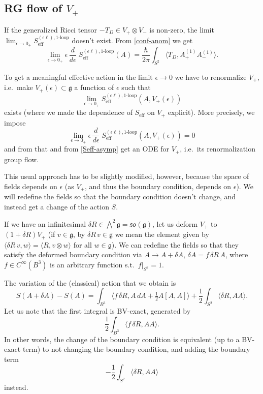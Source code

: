 \documentclass[a4paper]{amsart}
\theoremstyle{plain}
\theoremstyle{definition}
\newcommand{\mf}{\mathfrak}
\newcommand{\g}{\mathfrak{g}}
\newcommand{\bw}{{\textstyle\bigwedge}}
\newcommand{\la}{\langle}
\newcommand{\ra}{\rangle}
\begin{document}
\subsection{RG flow of $V_+$}\label{ss:RGflow}
If the generalized Ricci tensor $-T_{D}\in V_+\otimes V_-$ is non-zero, the limit $\lim_{\epsilon\to0_+}S_\text{eff}^{(\epsilon\ell),\text{1-loop}}$ doesn't exist.
From \eqref{conf-anom} we get
\begin{equation}\label{Seff-asymp}
  \lim_{\epsilon\to0_+} \epsilon\,\frac d{d\epsilon}\; S_\text{eff}^{(\epsilon\ell),\text{1-loop}}(A)= \frac\hbar{2\pi}\int_{S^2} \la T_{D}, A^{(1)}_+ A^{(1)}_-\ra.  
\end{equation}

To get a meaningful effective action in the limit $\epsilon\to0$ we have to renormalize $V_+$, i.e.\ make $V_+(\epsilon)\subset\g$  a function of $\epsilon$ such that
$$
\lim_{\epsilon\to0_+}S_\text{eff}^{(\epsilon\ell),\text{1-loop}}(A,V_+(\epsilon))
$$
exists (where we made the dependence of $S_\text{eff}$ on $V_+$ explicit). More precisely, we impose
\begin{equation}\label{RG-howto}
\lim_{\epsilon\to0_+} \epsilon\,\frac d{d\epsilon}\; S_\text{eff}^{(\epsilon\ell),\text{1-loop}}(A,V_+(\epsilon))=0
\end{equation}
and from that and from \eqref{Seff-asymp} get an ODE for $V_+$, i.e.\ its renormalization group flow.

This usual approach has to be slightly modified, however, because the space of fields depends on $\epsilon$ (as $V_+$, and thus the boundary condition, depends on $\epsilon$). We will redefine the fields so that the boundary condition doesn't change, and instead get a change of the action $S$.

If we have an infinitesimal $\delta R\in\bw^2\g=\mf{so}(\g)$, let us deform $V_+$ to $(1+\delta R)V_+$ (if $v\in\g$, by $\delta R\,v\in\g$ we mean the element given by $\la\delta R\,v,w\ra=\la R,v\otimes w\ra$ for all $w\in\g$). We can redefine the fields so that they satisfy the deformed boundary condition via $A\to A+\delta A$, $\delta A= f\,\delta R\,A$, where $f\in C^\infty(B^3)$ is an arbitrary function s.t.\ $f|_{S^2}=1$.


The variation of the (classical) action that we obtain is
$$S(A+\delta A)-S(A) = 
\int_{B^3}\bigl\la f\,\delta R, A\,dA+\tfrac12A[A,A]\bigr\ra + \frac12\int_{S^2}\la \delta R,AA\ra.
$$
 Let us note that the first integral is BV-exact, generated by
 $$\frac12\int_{B^3}\la f\,\delta R, AA\ra.$$
In other words, the change of the boundary condition is equivalent (up to a BV-exact term) to not changing the boundary condition, and adding the boundary term
$$-\frac12\int_{S^2}\la \delta R,AA\ra$$
instead.
\end{document}
